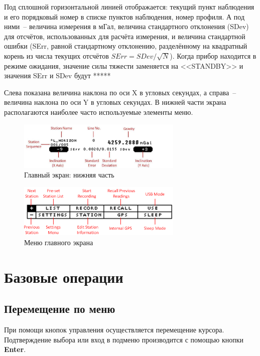Под сплошной горизонтальной линией отображается: текущий пункт наблюдения и его
порядковый номер в списке пунктов наблюдения, номер профиля. А под ними~--
величина измерения в мГал, величина стандартного отклонения (SDev) для отсчётов,
использованных для расчёта измерения, и величина стандартной ошибки (SErr,
равной стандартному отклонению, разделённому на квадратный корень из числа
текущих отсчётов $ SErr = SDev/\sqrt{N} $). Когда прибор находится в режиме
ожидания, значение силы тяжести заменяется на <<STANDBY>> и значения SErr и SDev
будут *****

Слева показана величина наклона по оси X в угловых секундах, а справа~-- величина
наклона по оси Y в угловых секундах.
В нижней части экрана располагаются наиболее часто используемые элементы меню.

\begin{figure}[h]
  \centering
  \includegraphics[width=0.7\textwidth]{figures/main_screen_lower_part}
  \caption{Главный экран: нижняя часть}
  \label{fig:main_screen_lower_part}
\end{figure}

\begin{figure}[h]
  \centering
  \includegraphics[width=0.7\textwidth]{figures/main_screen_menu}
  \caption{Меню главного экрана}
  \label{fig:main_screen_menu}
\end{figure}

\section{Базовые операции}

\subsection{Перемещение по меню}

При помощи кнопок управления осуществляется перемещение курсора.  Подтверждение
выбора или вход в подменю производится с помощью кнопки \textbf{Enter}.

